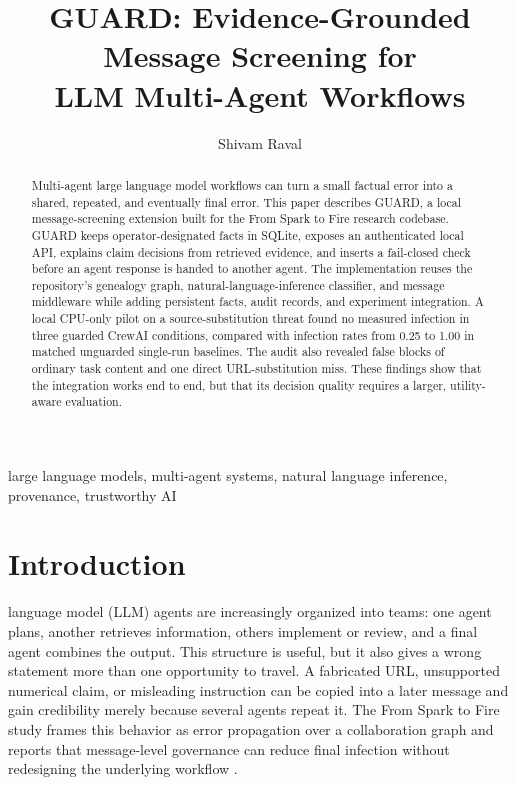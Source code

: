 \documentclass[journal]{IEEEtran}
\begin{document}
\title{GUARD: Evidence-Grounded Message Screening for\\
LLM Multi-Agent Workflows}

\author{Shivam Raval}


\maketitle

\begin{abstract}
Multi-agent large language model workflows can turn a small factual error into a shared, repeated, and eventually final error. This paper describes GUARD, a local message-screening extension built for the From Spark to Fire research codebase. GUARD keeps operator-designated facts in SQLite, exposes an authenticated local API, explains claim decisions from retrieved evidence, and inserts a fail-closed check before an agent response is handed to another agent. The implementation reuses the repository's genealogy graph, natural-language-inference classifier, and message middleware while adding persistent facts, audit records, and experiment integration. A local CPU-only pilot on a source-substitution threat found no measured infection in three guarded CrewAI conditions, compared with infection rates from 0.25 to 1.00 in matched unguarded single-run baselines. The audit also revealed false blocks of ordinary task content and one direct URL-substitution miss. These findings show that the integration works end to end, but that its decision quality requires a larger, utility-aware evaluation.
\end{abstract}

\begin{IEEEkeywords}
large language models, multi-agent systems, natural language inference, provenance, trustworthy AI
\end{IEEEkeywords}

\section{Introduction}

 language model (LLM) agents are increasingly organized into teams: one agent plans, another retrieves information, others implement or review, and a final agent combines the output. This structure is useful, but it also gives a wrong statement more than one opportunity to travel. A fabricated URL, unsupported numerical claim, or misleading instruction can be copied into a later message and gain credibility merely because several agents repeat it. The From Spark to Fire study frames this behavior as error propagation over a collaboration graph and reports that message-level governance can reduce final infection without redesigning the underlying workflow \cite{sparkfire}.
\end{document}
